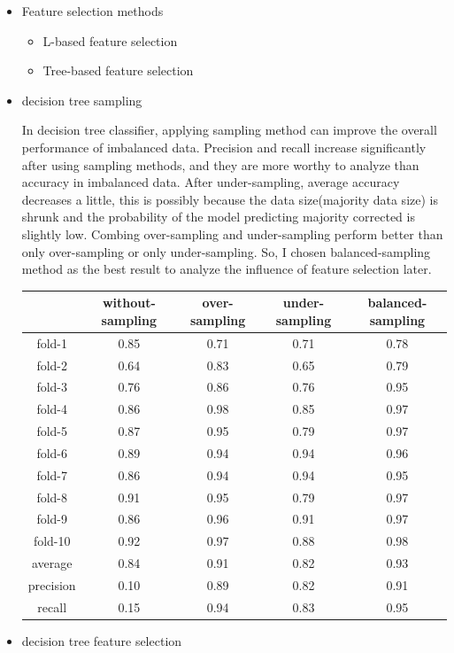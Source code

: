 \documentclass{article}
\begin{document}
\begin{itemize}
\item Feature selection methods

\begin{itemize}
    \item L-based feature selection
    \item Tree-based feature selection
\end{itemize}

\item decision tree sampling

In decision tree classifier, applying sampling method can improve the overall performance of imbalanced data. Precision and recall increase significantly after using sampling methods, and they are more worthy to analyze than accuracy in imbalanced data. After under-sampling, average accuracy decreases a little, this is possibly because the data size(majority data size) is shrunk and the probability of the model predicting majority corrected is slightly low. Combing over-sampling and under-sampling perform better than only over-sampling or only under-sampling. So, I chosen balanced-sampling method as the best result to analyze the influence of feature selection later.

\begin{tabular}{c|c|c|c|c}
\hline
 &without-sampling &over-sampling &under-sampling &balanced-sampling\\
\hline
fold-1 &0.85 &0.71 &0.71 &0.78\\
\hline
fold-2 &0.64 &0.83 &0.65 &0.79\\
\hline
fold-3 &0.76 &0.86 &0.76 &0.95\\
\hline
fold-4 &0.86 &0.98 &0.85 &0.97\\
\hline
fold-5 &0.87 &0.95 &0.79 &0.97\\
\hline
fold-6 &0.89 &0.94 &0.94 &0.96\\
\hline
fold-7 &0.86 &0.94 &0.94 &0.95\\
\hline
fold-8 &0.91 &0.95 &0.79 &0.97\\
\hline
fold-9 &0.86 &0.96 &0.91 &0.97\\
\hline
fold-10 &0.92 &0.97 &0.88 &0.98\\
\hline
average &0.84 &0.91 &0.82 &0.93\\
\hline
precision &0.10 &0.89 &0.82 &0.91\\
\hline
recall &0.15 &0.94 &0.83 &0.95\\
\hline
\end{tabular}

\item decision tree feature selection


\end{itemize}
\end{document}
